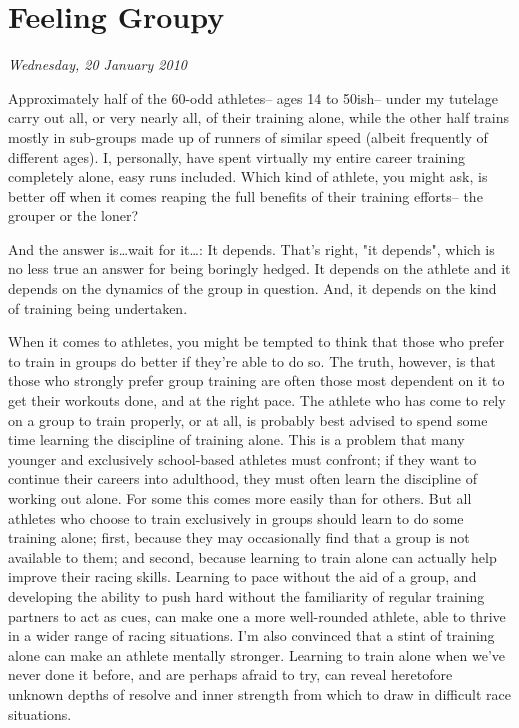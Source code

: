 \chapter{Feeling Groupy}
\textit{Wednesday, 20 January 2010}
\bigskip

Approximately half of the 60-odd athletes-- ages 14 to 50ish-- under my tutelage carry out all, or very nearly all, of their training alone, while the other half trains mostly in sub-groups made up of runners of similar speed (albeit frequently of different ages). I, personally, have spent virtually my entire career training completely alone, easy runs included. Which kind of athlete, you might ask, is better off when it comes reaping the full benefits of their training efforts-- the grouper or the loner?

And the answer is\ldots wait for it\ldots: It depends. That's right, "it depends", which is no less true an answer for being boringly hedged. It depends on the athlete and it depends on the dynamics of the group in question. And, it depends on the kind of training being undertaken.

When it comes to athletes, you might be tempted to think that those who prefer to train in groups do better if they're able to do so. The truth, however, is that those who strongly prefer group training are often those most dependent on it to get their workouts done, and at the right pace. The athlete who has come to rely on a group to train properly, or at all, is probably best advised to spend some time learning the discipline of training alone. This is a problem that many younger and exclusively school-based athletes must confront; if they want to continue their careers into adulthood, they must often learn the discipline of working out alone. For some this comes more easily than for others. But all athletes who choose to train exclusively in groups should learn to do some training alone; first, because they may occasionally find that a group is not available to them; and second, because learning to train alone can actually help improve their racing skills. Learning to pace without the aid of a group, and developing the ability to push hard without the familiarity of regular training partners to act as cues, can make one a more well-rounded athlete, able to thrive in a wider range of racing situations. I'm also convinced that a stint of training alone can make an athlete mentally stronger. Learning to train alone when we've never done it before, and are perhaps afraid to try, can reveal heretofore unknown depths of resolve and inner strength from which to draw in difficult race situations.

